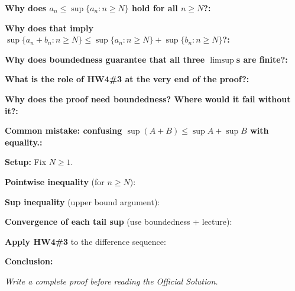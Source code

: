 \documentclass[12pt]{article}
\newcommand{\fillfield}[1]{%
  \par\noindent\textbf{#1:}\enspace\hrulefill\par\vspace{3pt}%
}
\newcommand{\writespace}[1]{\vspace{#1}}
\begin{document}
\begin{tcolorbox}[
  enhanced, breakable,
  colback  = pass3orange,
  colframe = orange!65!black,
  fonttitle = \bfseries,
  title = {Pass 3 \enspace\textbf{--}\enspace Self-Explanation}
]
\fillfield{Why does $a_n \leq \sup\{a_n : n \geq N\}$ hold for all $n \geq N$?}
\fillfield{Why does that imply $\sup\{a_n+b_n : n \geq N\} \leq \sup\{a_n : n \geq N\} + \sup\{b_n : n \geq N\}$?}
\fillfield{Why does boundedness guarantee that all three $\limsup$s are finite?}
\fillfield{What is the role of HW4\#3 at the very end of the proof?}
\fillfield{Why does the proof need boundedness? Where would it fail without it?}
\fillfield{Common mistake: confusing $\sup(A+B) \leq \sup A + \sup B$ with equality.}
\end{tcolorbox}

\newpage

\begin{tcolorbox}[
  enhanced, breakable,
  colback  = pass4purple,
  colframe = purple!55!black,
  fonttitle = \bfseries,
  title = {Pass 4 \enspace\textbf{--}\enspace Skeleton Proof}
]
\noindent\textbf{Setup:} Fix $N \geq 1$.\par
\writespace{0.4cm}

\noindent\textbf{Pointwise inequality} (for $n \geq N$):\par
\writespace{1.6cm}

\noindent\textbf{Sup inequality} (upper bound argument):\par
\writespace{1.8cm}

\noindent\textbf{Convergence of each tail sup} (use boundedness + lecture):\par
\writespace{1.8cm}

\noindent\textbf{Apply HW4\#3} to the difference sequence:\par
\writespace{2.0cm}

\noindent\textbf{Conclusion:}\par
\writespace{1.0cm}
\end{tcolorbox}

\newpage

\begin{tcolorbox}[
  enhanced, breakable,
  colback  = pass5gray,
  colframe = black!38,
  fonttitle = \bfseries,
  title = {Pass 5 \enspace\textbf{--}\enspace Full Proof Attempt}
]
\small\itshape Write a complete proof before reading the Official Solution.\par
\normalfont\normalsize
\writespace{19cm}
\end{tcolorbox}
\end{document}
